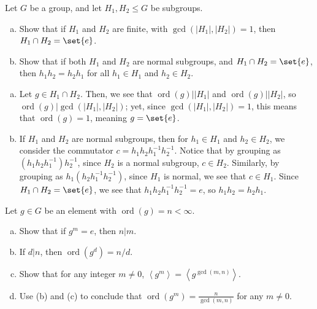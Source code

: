 \documentclass[10pt]{mypackage}
\begin{document}
\begin{problem}[Problem 3]
  Let $G$ be a group, and let $H_1,H_2\leq G$ be subgroups.
  \begin{enumerate}[(a)]
    \item Show that if $H_1$ and $H_2$ are finite, with $\gcd\left(\left\vert H_1 \right\vert,\left\vert H_2 \right\vert\right) = 1$, then $H_1\cap H_2 = \set{e}$.
    \item Show that if both $H_1$ and $H_2$ are normal subgroups, and $H_1\cap H_2 = \set{e}$, then $h_1h_2 = h_2h_1$ for all $h_1\in H_1$ and $h_2\in H_2$.
  \end{enumerate}
\end{problem}
\begin{solution}\hfill
  \begin{enumerate}[(a)]
    \item Let $g\in H_1\cap H_2$. Then, we see that $\operatorname{ord}\left( g \right) | \left\vert H_1 \right\vert$ and $\operatorname{ord}\left( g \right) | \left\vert H_2 \right\vert$, so $\operatorname{ord}(g) | \gcd\left( \left\vert H_1 \right\vert,\left\vert H_2 \right\vert \right)$; yet, since $\gcd\left( \left\vert H_1 \right\vert,\left\vert H_2 \right\vert \right) = 1$, this means that $\operatorname{ord}\left( g \right) = 1$, meaning $g = \set{e}$.
    \item If $H_1$ and $H_2$ are normal subgroups, then for $h_1\in H_1$ and $h_2\in H_2$, we consider the commutator $c = h_1h_2h_1^{-1}h_2^{-1}$. Notice that by grouping as $\left( h_1h_2h_1^{-1} \right)h_2^{-1}$, since $H_2$ is a normal subgroup, $c\in H_2$. Similarly, by grouping as $h_1\left( h_2h_1^{-1}h_2^{-1} \right)$, since $H_1$ is normal, we see that $c\in H_1$. Since $H_1\cap H_2 = \set{e}$, we see that $h_1h_2h_1^{-1}h_2^{-1} = e$, so $h_1h_2 = h_2h_1$.
  \end{enumerate}
\end{solution}
\begin{problem}[Problem 4]
  Let $g\in G$ be an element with $\operatorname{ord}\left( g \right) = n < \infty$.
  \begin{enumerate}[(a)]
    \item Show that if $g^{m} = e$, then $n | m$.
    \item If $d | n$, then $\operatorname{ord}\left( g^{d} \right) = n/d$.
    \item Show that for any integer $m\neq 0$, $\left\langle g^{m} \right\rangle = \left\langle g^{\gcd\left( m,n \right)} \right\rangle$.
    \item Use (b) and (c) to conclude that $\operatorname{ord}\left( g^{m} \right) = \frac{n}{\gcd\left( m,n \right)}$ for any $m\neq 0$.
  \end{enumerate}
\end{problem}
\end{document}
